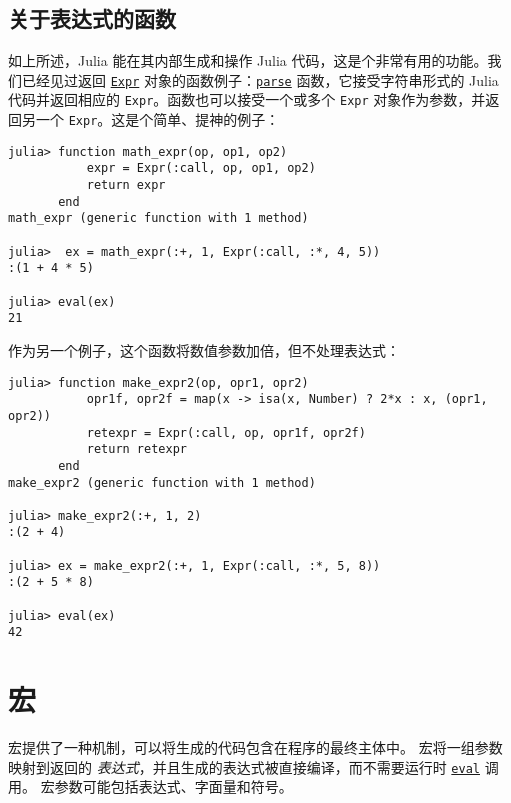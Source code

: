 \subsection{关于表达式的函数}



如上所述，Julia 能在其内部生成和操作 Julia 代码，这是个非常有用的功能。我们已经见过返回 \hyperlink{17120496304147995299}{\texttt{Expr}} 对象的函数例子：\hyperlink{14207407853646164654}{\texttt{parse}} 函数，它接受字符串形式的 Julia 代码并返回相应的 \texttt{Expr}。函数也可以接受一个或多个 \texttt{Expr} 对象作为参数，并返回另一个 \texttt{Expr}。这是个简单、提神的例子：




\begin{verbatim}
julia> function math_expr(op, op1, op2)
           expr = Expr(:call, op, op1, op2)
           return expr
       end
math_expr (generic function with 1 method)

julia>  ex = math_expr(:+, 1, Expr(:call, :*, 4, 5))
:(1 + 4 * 5)

julia> eval(ex)
21
\end{verbatim}



作为另一个例子，这个函数将数值参数加倍，但不处理表达式：




\begin{verbatim}
julia> function make_expr2(op, opr1, opr2)
           opr1f, opr2f = map(x -> isa(x, Number) ? 2*x : x, (opr1, opr2))
           retexpr = Expr(:call, op, opr1f, opr2f)
           return retexpr
       end
make_expr2 (generic function with 1 method)

julia> make_expr2(:+, 1, 2)
:(2 + 4)

julia> ex = make_expr2(:+, 1, Expr(:call, :*, 5, 8))
:(2 + 5 * 8)

julia> eval(ex)
42
\end{verbatim}



\hypertarget{11146454106624591870}{}


\section{宏}



宏提供了一种机制，可以将生成的代码包含在程序的最终主体中。 宏将一组参数映射到返回的 \emph{表达式}，并且生成的表达式被直接编译，而不需要运行时 \hyperlink{7507639810592563424}{\texttt{eval}} 调用。 宏参数可能包括表达式、字面量和符号。




